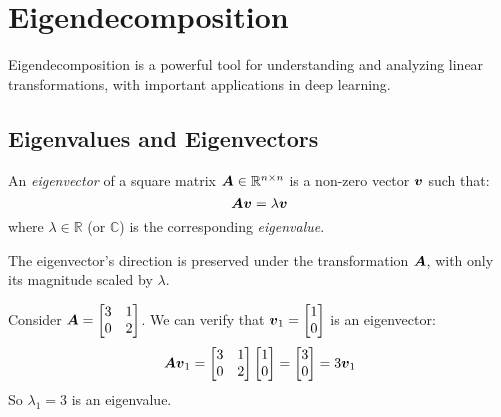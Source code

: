 
\section{Eigendecomposition }
\label{sec:eigendecomposition}

Eigendecomposition is a powerful tool for understanding and analyzing linear transformations, with important applications in deep learning.

\subsection{Eigenvalues and Eigenvectors}

\begin{definition}
An \emph{eigenvector} of a square matrix $\boldsymbol{A} \in \mathbb{R}^{n \times n}$ is a non-zero vector $\boldsymbol{v}$ such that:
\begin{equation}
    \boldsymbol{A}\boldsymbol{v} = \lambda\boldsymbol{v}
\end{equation}
where $\lambda \in \mathbb{R}$ (or $\mathbb{C}$) is the corresponding \emph{eigenvalue}.
\end{definition}

The eigenvector's direction is preserved under the transformation $\boldsymbol{A}$, with only its magnitude scaled by $\lambda$.

\begin{example}
Consider $\boldsymbol{A} = \begin{bmatrix} 3 & 1 \\ 0 & 2 \end{bmatrix}$. We can verify that $\boldsymbol{v}_1 = \begin{bmatrix} 1 \\ 0 \end{bmatrix}$ is an eigenvector:
\begin{equation}
    \boldsymbol{A}\boldsymbol{v}_1 = \begin{bmatrix} 3 & 1 \\ 0 & 2 \end{bmatrix}\begin{bmatrix} 1 \\ 0 \end{bmatrix} = \begin{bmatrix} 3 \\ 0 \end{bmatrix} = 3\boldsymbol{v}_1
\end{equation}
So $\lambda_1 = 3$ is an eigenvalue.
\end{example}

